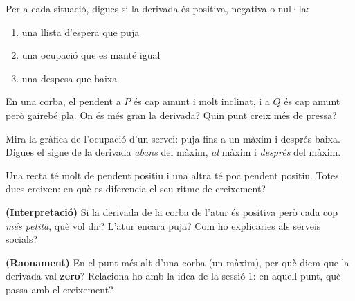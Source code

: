 \begin{exercicis}
\begin{exlist}
  \item Per a cada situació, digues si la derivada és positiva, negativa o nul·la:
        \begin{enumerate}[label=\alph*), leftmargin=1.6em, topsep=2pt]
          \item una llista d'espera que puja \hfill
          \item una ocupació que es manté igual \hfill
          \item una despesa que baixa
        \end{enumerate}
  \item En una corba, el pendent a $P$ és cap amunt i molt inclinat, i a $Q$ és cap
        amunt però gairebé pla. On és més gran la derivada? Quin punt creix més de
        pressa?
  \item Mira la gràfica de l'ocupació d'un servei: puja fins a un màxim i després
        baixa. Digues el signe de la derivada \emph{abans} del màxim, \emph{al} màxim i
        \emph{després} del màxim.
  \item Una recta té molt de pendent positiu i una altra té poc pendent positiu.
        Totes dues creixen: en què es diferencia el seu ritme de creixement?
  \item \textbf{(Interpretació)} Si la derivada de la corba de l'atur és positiva però
        cada cop \emph{més petita}, què vol dir? L'atur encara puja? Com ho explicaries
        als serveis socials?
  \item \textbf{(Raonament)} En el punt més alt d'una corba (un màxim), per què diem que
        la derivada val \textbf{zero}? Relaciona-ho amb la idea de la sessió 1: en aquell
        punt, què passa amb el creixement?
\end{exlist}
\end{exercicis}

